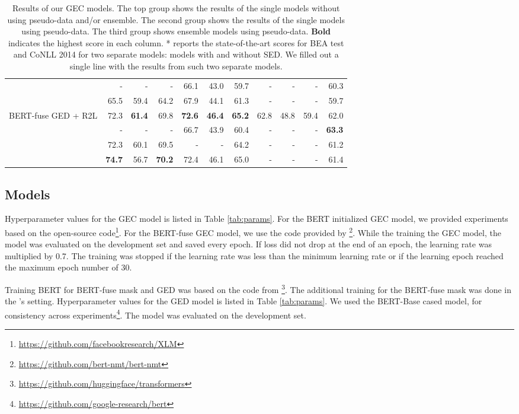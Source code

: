 \documentclass[11pt,a4paper]{article}
\begin{document}
\begin{table*}[ht]
{\begin{tabular}{lrrrrrrrrrr}
 \citet{awasthi-etal-2019-parallel} & - & - & - & 66.1 & 43.0 & 59.7 & - & - & - & 60.3 \\
 \citet{kiyono-etal-2019-empirical} & 65.5 & 59.4 & 64.2 & 67.9 & 44.1 & 61.3 & - & - & - & 59.7 \\
 \midrule
 BERT-fuse GED + R2L & 72.3 & \bf 61.4 & 69.8 & \bf 72.6 & \bf 46.4 & \bf 65.2 & 62.8 & 48.8 & 59.4 & 62.0 \\
 \citet{lichtarge-etal-2019-corpora} & - & - & - & 66.7 & 43.9 & 60.4 & - & - & - & \bf 63.3 \\
\citet{grundkiewicz-etal-2019-neural} & 72.3 & 60.1 & 69.5 & - & - & 64.2 & - & - & - & 61.2\\
 \citet{kiyono-etal-2019-empirical} & \bf 74.7 & 56.7 & \bf 70.2 & 72.4 & 46.1 & 65.0 & - & - & - & 61.4 \\
 \bottomrule
 \end{tabular}}
\caption{Results of our GEC models. The top group shows the results of the single models without using pseudo-data and/or ensemble. The second group shows the results of the single models using pseudo-data. The third group shows ensemble models using pseudo-data. {\bf Bold} indicates the highest score in each column. * reports the state-of-the-art scores for BEA test and CoNLL 2014 for two separate models: models with and without SED. We filled out a single line with the results from such two separate models.}
  \label{tab:gec_result}
\vspace{-1.5mm}
\end{table*}

\subsection{Models}
Hyperparameter values for the GEC model is listed in Table \ref{tab:params}.
For the BERT initialized GEC model, we provided experiments based on the open-source code\footnote{{\url{https://github.com/facebookresearch/XLM}}}.
For the BERT-fuse GEC model, we use the code provided by \citet{Zhu2020IncorporatingBI}\footnote{\url{https://github.com/bert-nmt/bert-nmt}}.
While the training the GEC model, the model was evaluated on the development set and saved every epoch.
If loss did not drop at the end of an epoch, the learning rate was multiplied by 0.7.
The training was stopped if the learning rate was less than the minimum learning rate or if the learning epoch reached the maximum epoch number of 30.

Training BERT for BERT-fuse mask and GED was based on the code from \citet{Wolf2019HuggingFacesTS}\footnote{\url{https://github.com/huggingface/transformers}}.
The additional training for the BERT-fuse mask was done in the \citet{devlin-etal-2019-bert}'s setting.
Hyperparameter values for the GED model is listed in Table \ref{tab:params}.
We used the BERT-Base cased model, for consistency across experiments\footnote{\url{https://github.com/google-research/bert}}.
The model was evaluated on the development set.
\end{document}
